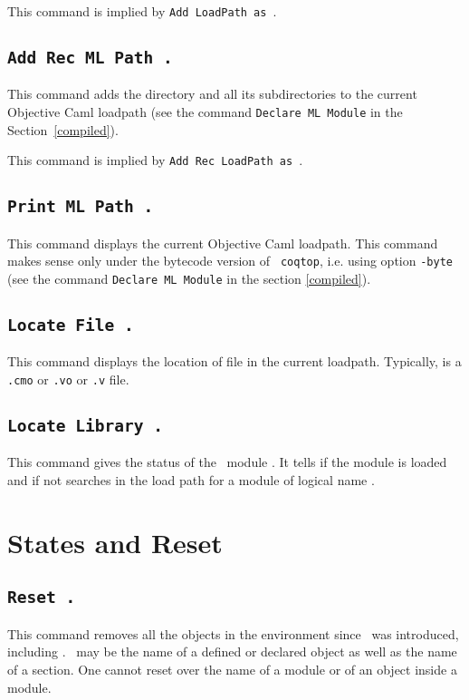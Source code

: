 \Rem This command is implied by {\tt Add LoadPath {\str} as {\dirpath}}.

\subsection[\tt Add Rec ML Path {\str}.]{\tt Add Rec ML Path {\str}.}
This command adds the directory {\str} and all its subdirectories 
to the current Objective Caml loadpath (see
the command {\tt Declare ML Module} in the Section~\ref{compiled}).

\Rem This command is implied by {\tt Add Rec LoadPath {\str} as {\dirpath}}.

\subsection[\tt Print ML Path {\str}.]{\tt Print ML Path {\str}.}
This command displays the current Objective Caml loadpath.
This command makes sense only under the bytecode version of {\tt
coqtop}, i.e. using option {\tt -byte} (see the
command {\tt Declare ML Module} in the section
\ref{compiled}).

\subsection[\tt Locate File {\str}.]{\tt Locate File {\str}.\label{Locate File}}
This command displays the location of file {\str} in the current loadpath.
Typically, {\str} is a \texttt{.cmo} or \texttt{.vo} or \texttt{.v} file.

\subsection[\tt Locate Library {\dirpath}.]{\tt Locate Library {\dirpath}.\label{Locate Library}}
This command gives the status of the \Coq\ module {\dirpath}. It tells if the
module is loaded and if not searches in the load path for a module
of logical name {\dirpath}.

\section{States and Reset}

\subsection[\tt Reset \ident.]{\tt Reset \ident.}
This command removes all the objects in the environment since \ident\ 
was introduced, including \ident. \ident\ may be the name of a defined
or declared object as well as the name of a section.  One cannot reset
over the name of a module or of an object inside a module.

